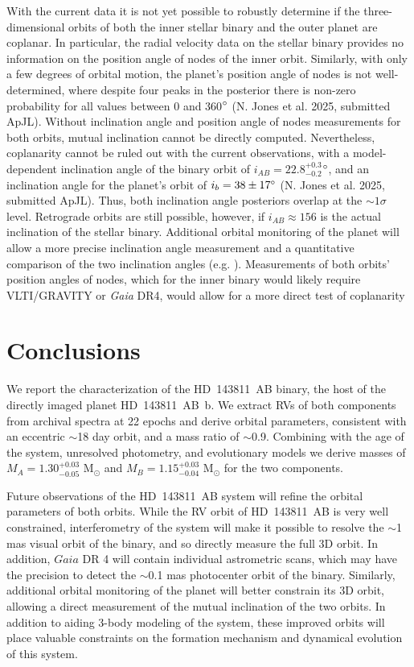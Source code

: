 \documentclass[]{aastex701} %
\begin{document}
With the current data it is not yet possible to robustly determine if the three-dimensional orbits of both the inner stellar binary and the outer planet are coplanar. In particular, the radial velocity data on the stellar binary provides no information on the position angle of nodes of the inner orbit. Similarly, with only a few degrees of orbital motion, the planet's position angle of nodes is not well-determined, where despite four peaks in the posterior there is non-zero probability for all values between 0 and 360$\degree$ (N. Jones et al. 2025, submitted ApJL). Without inclination angle and position angle of nodes measurements for both orbits, mutual inclination cannot be directly computed. Nevertheless, coplanarity cannot be ruled out with the current observations, with a model-dependent inclination angle of the binary orbit of $i_{AB} = 22.8^{+0.3}_{-0.2} $$ \degree$, and an inclination angle for the planet's orbit of $i_{b} = 38 \pm 17 \degree$ (N. Jones et al. 2025, submitted ApJL). Thus, both inclination angle posteriors overlap at the $\sim 1 \sigma$ level. Retrograde orbits are still possible, however, if $i_{AB} \approx 156$ is the actual inclination of the stellar binary. Additional orbital monitoring of the planet will allow a more precise inclination angle measurement and a quantitative comparison of the two inclination angles (e.g. \citealt{kennedy:2013}). Measurements of both orbits' position angles of nodes, which for the inner binary would likely require VLTI/GRAVITY or \textit{Gaia} DR4, would allow for a more direct test of coplanarity




\section{Conclusions}

We report the characterization of the HD~143811~AB binary, the host of the directly imaged planet HD~143811~AB~b. We extract RVs of both components from archival spectra at 22 epochs and derive orbital parameters, consistent with an eccentric $\sim$18 day orbit, and a mass ratio of $\sim$0.9. Combining with the age of the system, unresolved photometry, and evolutionary models we derive masses of $M_A = 1.30^{+0.03}_{-0.05}$ M$_\odot$ and $M_B = 1.15^{+0.03}_{-0.04}$ M$_\odot$ for the two components.

Future observations of the HD~143811~AB system will refine the orbital parameters of both orbits. While the RV orbit of HD~143811~AB is very well constrained, interferometry of the system will make it possible to resolve the $\sim$1 mas visual orbit of the binary, and so directly measure the full 3D orbit. In addition, $Gaia$ DR 4 will contain individual astrometric scans, which may have the precision to detect the $\sim$0.1 mas photocenter orbit of the binary. Similarly, additional orbital monitoring of the planet will better constrain its 3D orbit, allowing a direct measurement of the mutual inclination of the two orbits. In addition to aiding 3-body modeling of the system, these improved orbits will place valuable constraints on the formation mechanism and dynamical evolution of this system.
\end{document}
